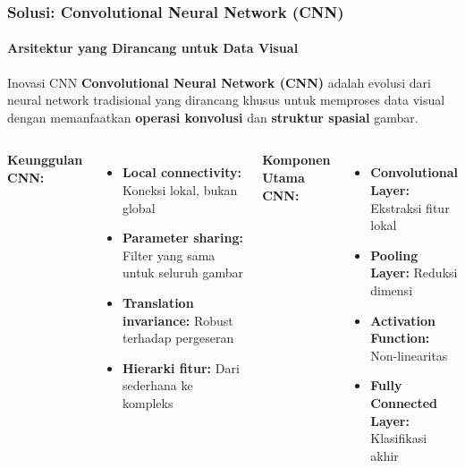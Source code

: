 \documentclass[t,aspectratio=169,xcolor=dvipsnames]{beamer}
\begin{document}
\begin{frame}
    \frametitle{Solusi: Convolutional Neural Network (CNN)}
    \framesubtitle{Arsitektur yang Dirancang untuk Data Visual}
    \small
    \begin{exampleblock}{Inovasi CNN}
        \textbf{Convolutional Neural Network (CNN)} adalah evolusi dari neural network tradisional yang dirancang khusus untuk memproses data visual dengan memanfaatkan \textbf{operasi konvolusi} dan \textbf{struktur spasial} gambar.
    \end{exampleblock}
    \footnotesize

    \begin{columns}[t]
        \textbf{Keunggulan CNN:}
        \begin{itemize}
            \item \textbf{Local connectivity:} Koneksi lokal, bukan global
            \item \textbf{Parameter sharing:} Filter yang sama untuk seluruh gambar
            \item \textbf{Translation invariance:} Robust terhadap pergeseran
            \item \textbf{Hierarki fitur:} Dari sederhana ke kompleks
        \end{itemize}

        \textbf{Komponen Utama CNN:}
        \begin{itemize}
            \item \textbf{Convolutional Layer:} Ekstraksi fitur lokal
            \item \textbf{Pooling Layer:} Reduksi dimensi
            \item \textbf{Activation Function:} Non-linearitas
            \item \textbf{Fully Connected Layer:} Klasifikasi akhir
        \end{itemize}
    \end{columns}

\end{frame}
\end{document}
